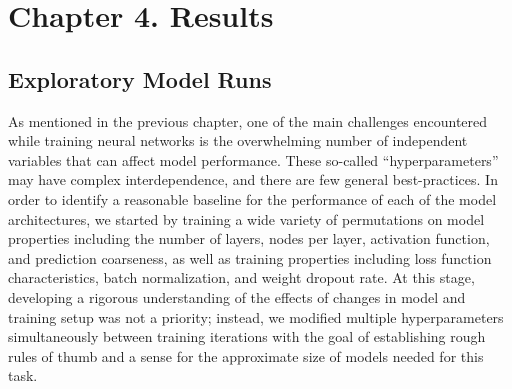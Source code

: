 \chapter{Chapter 4. Results}

\renewcommand{\arraystretch}{0.9}

\section{Exploratory Model Runs}

As mentioned in the previous chapter, one of the main challenges encountered while training neural networks is the overwhelming number of independent variables that can affect model performance. These so-called ``hyperparameters'' may have complex interdependence, and there are few general best-practices. In order to identify a reasonable baseline for the performance of each of the model architectures, we started by training a wide variety of permutations on model properties including the number of layers, nodes per layer, activation function, and prediction coarseness, as well as training properties including loss function characteristics, batch normalization, and weight dropout rate. At this stage, developing a rigorous understanding of the effects of changes in model and training setup was not a priority; instead, we modified multiple hyperparameters simultaneously between training iterations with the goal of establishing rough rules of thumb and a sense for the approximate size of models needed for this task.

